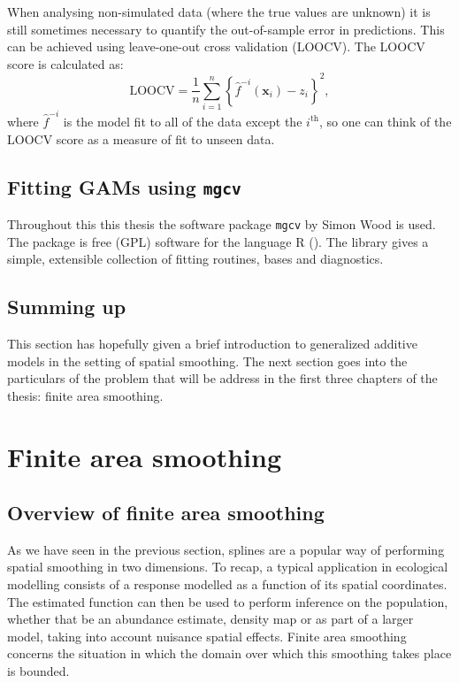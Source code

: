 When analysing non-simulated data (where the true values are unknown) it is still sometimes necessary to quantify the out-of-sample error in predictions. This can be achieved using leave-one-out cross validation (LOOCV). The LOOCV score is calculated as:
\begin{equation}
\text{LOOCV} = \frac{1}{n} \sum_{i=1}^n \left \{ \hat{f}^{-i}(\mathbf{x}_i) - z_i \right\}^2,
\end{equation}
where $\hat{f}^{-i}$ is the model fit to all of the data except the $i^\text{th}$, so one can think of the LOOCV score as a measure of fit to unseen data.

\subsection{Fitting GAMs using \texttt{mgcv}}
\label{intro-mgcv}

Throughout this this thesis the software package \texttt{mgcv} by Simon Wood is used. The package is free (GPL) software for the language \textsf{R} (\cite{Rsoftware}). The library gives a simple, extensible collection of fitting routines, bases and diagnostics.


\subsection{Summing up}

This section has hopefully given a brief introduction to generalized additive models in the setting of spatial smoothing. The next section goes into the particulars of the problem that will be address in the first three chapters of the thesis: finite area smoothing.


\section{Finite area smoothing}
\label{intro-FAS}

\subsection{Overview of finite area smoothing}

As we have seen in the previous section, splines are a popular way of performing spatial smoothing in two dimensions. To recap, a typical application in ecological modelling consists of a response modelled as a function of its spatial coordinates. The estimated function can then be used to perform inference on the population, whether that be an abundance estimate, density map or as part of a larger model, taking into account nuisance spatial effects. Finite area smoothing concerns the situation in which the domain over which this smoothing takes place is bounded.

